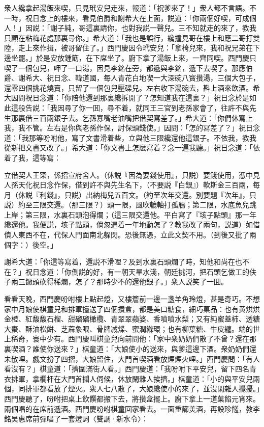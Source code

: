 衆人纔拿起湯飯來喫，只見玳安兒走來，報道：「祝爹來了！」衆人都不言語。不一時，祝日念上的樓來，看見伯爵和謝希大在上面，説道：「你兩個好喫，可成個人！」因説：「謝子純，哥這裏請你，也對我説一聲兒。三不知就走的來了，教我只顧在粘梅花處那裏尋你。」希大道：「我也是誤行，纔撞見哥在樓上和應二哥打雙陸，走上來作揖，被哥留住了。」西門慶因令玳安兒：「拿椅兒來，我和祝兄弟在下邊坐罷。」於是安放鍾筯，在下席坐了。廚下拿了湯飯上來，一齊同喫。西門慶只喫了一個包兒，呷了一口湯，因見李銘在旁，都遞與李銘，遞下去喫了。那應伯爵、謝希大、祝日念、韓道國，每人青花白地喫一大深碗八寳攢湯，三個大包子，還零四個挑花燒賣，只留了一個包兒壓碟兒。左右收下湯碗去，斟上酒來飲酒。希大因問祝日念道：「你陪他還到那裏纔拆開了？怎知道我在這裏？」祝日念於是如此這般告説：「我因尋了你一囬，尋不着，就同王三官到老孫家會了，往許不與先生那裏借三百兩銀子去。乞孫寡嘴老油嘴把借契寫差了。」希大道：「你們休寫上我，我不管。左右是你與老孫作保，討保頭錢使。」因問：「怎的冩差了？」祝日念道：「我那等吩咐他，寫了文書滑着些，立與他三限纔還他這銀子。不依我，教我從新把文書又改了。」希大道：「你文書上怎麽寫着？念一遍我聽。」祝日念道：「依着了我，這等寫：

\begin{myquote}
立借契人王寀，係招宣府舍人。{\marktext（休説『因為要錢使用』，只説）}要錢使用，憑中見人孫天化祝日念作保，借到許不與先生名下，{\marktext（不要説『白銀』）}軟斯金三百兩，每月{\marktext（休説『利錢』，只説）}出納梅兒五百文。{\marktext（約至次年交還。別要題『次年』，只説）}約至三限交還。{\marktext（那三限？）}頭一限，風吹轆軸打孤鴈；第二限，水底魚兒跳上岸；第三限，水裏石頭泡得爛；{\marktext（這三限交還他。平白寫了『垓子點頭』那一年纔還他。我便説，垓子點頭，倘忽遇着一年地動怎了？教我改了兩句，説道）}如借債人東西不在，代保人門面南北躲閃。恐後無憑，立此文契不用。{\marktext（到後又批了兩個字：）}後空。」
\end{myquote}

謝希大道：「你這等寫着，還説不滑哩？及到水裏石頭爛了時，知他和尚在也不在？」祝日念道：「你倒説的好，有一朝天旱水淺，朝廷挑河，把石頭乞做工的伕子兩三鐝頭砍得稀爛，怎了？那時少不的還他銀子。」衆人説笑了一囬。

看看天晚，西門慶吩咐樓上點起燈，又樓簷前一邊一盞羊角玲燈，甚是奇巧。不想家中月娘使棋童兒和排軍擡送了四個攢盒，都是美口糖食，細巧菓品：也有黄烘烘金橙、紅馥馥石榴、甜磂磂橄欖、青翠翠蘋婆、香噴噴水梨；又有純蜜蓋柿、透糖大棗、酥油松餅、芝蔴象眼、骨牌减煠、蜜潤縧環；也有柳葉糖、牛皮纏。端的世上稀奇，寰中少有。西門慶叫棋童兒向前問他：「家中衆奶奶們散了不曾？還在那裏喫酒？誰使你送來？」棋童道：「大娘使小的送來，與爹這邊下酒。衆奶奶們還未散哩。戯文扮了四摺，大娘留住，大門首喫酒看放煙煙火哩。」西門慶問：「有人看沒有？」棋童道：「擠圍滿街人看。」西門慶道：「我吩咐下平安兒，留下四名青衣排軍，拿欄杆在大門首攔人伺候，休放閑雜人挨擠。」棋童道：「小的與平安兒兩個，同排軍都看放了煙火。衆人七八散了，大娘纔使小的來了，並沒閑雜人攪擾。」西門慶聽了，吩咐把桌上飲饌都搬下去，將攢盒擺上。廚下拿上一道菓餡元宵來。兩個唱的在席前遞酒。西門慶吩咐棋童回家看去。一面重篩羙酒，再設珍饈，教李銘吴惠席前彈唱了一套燈詞〈雙調·新水令〉：

